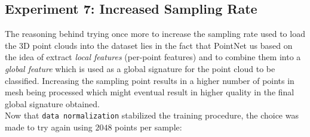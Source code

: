\documentclass[11pt,a4paper]{article}
\begin{document}
\subsection{Experiment 7: Increased Sampling Rate}
The reasoning behind trying once more to increase the sampling rate used to load the 3D point clouds into the dataset lies in the fact that PointNet us based on the idea of extract \textit{local features} (per-point features) and to combine them into a \textit{global feature} which is used as a global signature for the point cloud to be classified. Increasing the sampling point results in a higher number of points in mesh being processed which might eventual result in higher quality in the final global signature obtained.\\
Now that \texttt{data normalization} stabilized the training procedure, the choice was made to try again using $2048$ points per sample:
\end{document}
